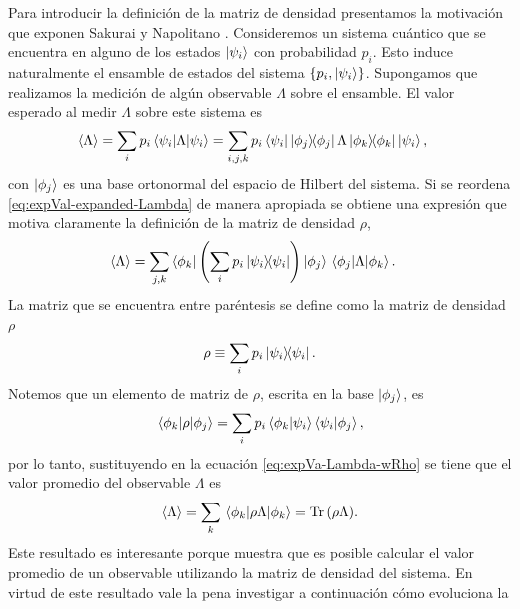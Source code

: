 Para introducir la definición de la matriz de densidad presentamos la 
motivación que exponen Sakurai y Napolitano \cite{sakurai_napolitano_2017}.
Consideremos un sistema cuántico que se encuentra en alguno de los estados 
$\ket{\psi_{i} }$ con probabilidad $p_i$. Esto induce naturalmente el 
ensamble de estados del sistema $\{p_i, \ket{\psi_i} \}$. 
Supongamos que realizamos 
la medición de algún observable $\Lambda$ sobre el ensamble. El 
valor esperado al medir $\Lambda$ sobre este sistema es
\begin{align}\label{eq:expVal-expanded-Lambda}
	\expval{\Lambda} &= \sum_i p_i \matrixel{\psii}{\Lambda}{\psii}
	= \sum_{i,j,k} p_i 
	\bra{\psii}\dyad{\phi_j}{\phi_j}\Lambda\dyad{\phi_k}{\phi_k}\Pk{i},
\end{align}
con $\ket{\phi_j}$ es una base ortonormal del
espacio de Hilbert del sistema. Si se reordena
\eqref{eq:expVal-expanded-Lambda} de manera apropiada
se obtiene una expresión 
que motiva claramente la definición de la matriz de densidad $\rho$,
\begin{align}\label{eq:expVa-Lambda-wRho}
	\expval{\Lambda}&= \sum _{j,k}\bra{\phi_k}\qty(\sum_ip_i \dyad{\psii}{\psii} 
	)\ket{\phi_j}	\matrixel{\phi_j}{\Lambda}{\phi_k}.
\end{align}
La matriz que se encuentra entre paréntesis se define como 
la matriz de densidad 
$\rho$~\cite{nielsen_chuang_2011, sakurai_napolitano_2017}
\begin{equation}\label{eq:rho_def}
	\rho \equiv \sum _i p_i\dyad{\psi_i}{\psi_i}.
\end{equation}
Notemos que un elemento de matriz de $\rho$, escrita en la base 
$\ket{\phi_j}$, es
\begin{align}
	\matrixel{\phi_k}{\rho}{\phi_j} = 
	\sum_ip_i \braket{\phi_k}{\psii}\braket{\psii}{\phi_j},
\end{align}
por lo tanto, sustituyendo en la ecuación \eqref{eq:expVa-Lambda-wRho}
se tiene que el valor promedio del observable $\Lambda$ es
\begin{align}\label{eq:Tr(rhoLambda)}
	\expval{\Lambda}=\sum _k \matrixel{\phi_k}{\rho \Lambda}{\phi_k} 
	= \Tr \qty(\rho\Lambda).
\end{align} 
Este resultado es interesante porque muestra que es posible 
calcular el valor promedio de un observable utilizando la 
matriz de densidad del sistema. En virtud de este resultado
vale la pena investigar a continuación cómo evoluciona la 
